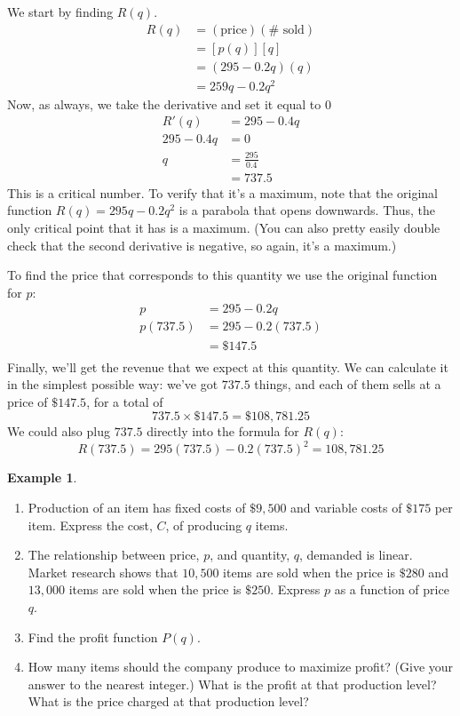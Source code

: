 \documentclass[oneside]{book}
\theoremstyle{definition}
\newtheorem{example}{Example}
\theoremstyle{solution}
\newtheorem*{solution}{Solution}
\newenvironment{solution}{\vspace{2in}\comment}{\endcomment}
\begin{document}
\begin{solution}
We start by finding $R(q)$.  
\begin{align*}
R(q) & = (\text{price})(\#\text{ sold})\\
   & = [p(q)][q]\\
   & = (295 -0.2q)(q)\\
  & = 259q-0.2q^2
\end{align*}
Now, as always, we take the derivative and set it equal to $0$
\begin{align*}
R'(q) & = 295 - 0.4 q\\
295 - 0.4 q & = 0\\
q & = \frac{295}{0.4} \\
  & =  737.5
\end{align*}
This is a critical number.  To verify that it's a maximum, note that
the original function $R(q) = 295q-0.2q^2$ is a parabola that opens
downwards.  Thus, the only critical point that it has is a maximum.
(You can also pretty easily double check that the second derivative is
negative, so again, it's a maximum.)

To find the price that corresponds to this quantity we use the
original function for $p$:
\begin{align*}
p & = 295 - 0.2 q\\
p(737.5) & = 295 - 0.2(737.5)\\
  & = \$ 147.5\\
\end{align*}
Finally, we'll get the revenue that we expect at this quantity.  We
can calculate it in the simplest possible way: we've got $737.5$
things, and each of them sells at a price of $\$147.5$, for a total of
$$
737.5\times \$147.5 = \$108,781.25
$$
We could also plug $737.5$ directly into the formula for $R(q)$:
$$
R(737.5) = 295(737.5) - 0.2 (737.5)^2 = 108,781.25
$$
\end{solution}

\begin{example}
\begin{enumerate}
\item Production of an item has fixed costs of $\$9,500$ and variable
  costs of $\$175$ per item. Express the cost, $C$, of producing $q$
  items.
\item The relationship between price, $p$, and quantity, $q$, demanded
  is linear. Market research shows that $10,500$ items are sold when
  the price is $\$280$ and $13,000$ items are sold when the price is
  $\$250$. Express $p$ as a function of price $q$.
\item Find the profit function $P(q)$.
\item How many items should the company produce to maximize profit?
  (Give your answer to the nearest integer.) What is the profit at
  that production level? What is the price charged at that production
  level?
\end{enumerate}
\end{example}
\end{document}
